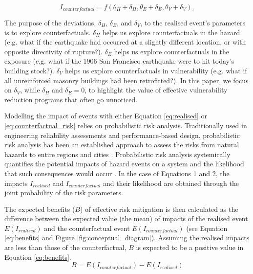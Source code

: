 \documentclass[utf8]{frontiersSCNS} %
\begin{document}
\begin{equation}\label{eq:counterfactual_risk}
    I_{counterfactual} = f \left( \theta_H + \delta_H,  \theta_E + \delta_E,  \theta_V + \delta_V \right),
    \end{equation}

The purpose of the deviations, $\delta_H$, $\delta_E$, and $\delta_V$, to the realised event’s parameters is to explore counterfactuals. $\delta_H$ helps us explore counterfactuals in the hazard (e.g. what if the earthquake had occurred at a slightly different location, or with opposite directivity of rupture?). $\delta_E$ helps us explore counterfactuals in the exposure (e.g. what if the 1906 San Francisco earthquake were to hit today’s building stock?). $\delta_V$ helps us explore counterfactuals in vulnerability (e.g. what if all unreinforced masonry buildings had been retrofitted?). In this paper, we focus on $\delta_V$, while $\delta_H$ and $\delta_E=0$, to highlight the value of effective vulnerability reduction programs that often go unnoticed.

Modelling the impact of events with either Equation \ref{eq:realised} or \ref{eq:counterfactual_risk} relies on probabilistic risk analysis. Traditionally used in engineering reliability assessments and performance-based design, probabilistic risk analysis has been an established approach to assess the risks from natural hazards to entire regions and cities \citep{pate2002risk, stergiou2010risk}. Probabilistic risk analysis systemically quantifies the potential impacts of hazard events on a system and the likelihood that such consequences would occur \citep{bedford2001probabilistic}. In the case of Equations 1 and 2, the impacts $I_{realised}$ and $I_{counterfactual}$ and their likelihood are obtained through the joint probability of the risk parameters.

The expected benefits ($B$) of effective risk mitigation is then calculated as the difference between the expected value (the mean) of impacts of the realised event $E(I_{realised})$ and the counterfactual event $E(I_{counterfactual})$ (see Equation \ref{eq:benefits} and Figure \ref{fig:conceptual_diagram}). Assuming the realised impacts are less than those of the counterfactual, $B$ is expected to be a positive value in Equation \ref{eq:benefits}.
    \begin{equation} \label{eq:benefits}
        B = E(I_{counterfactual}) - E(I_{realised})
    \end{equation}


\end{document}
